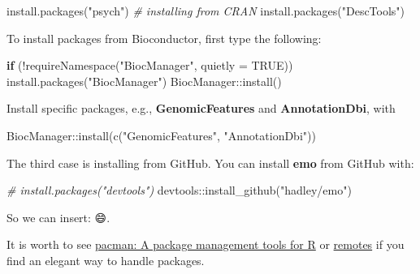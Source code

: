 \documentclass[
]{book}
\newenvironment{Shaded}{\begin{snugshade}}{\end{snugshade}}
\newcommand{\AttributeTok}[1]{\textcolor[rgb]{0.77,0.63,0.00}{#1}}
\newcommand{\CommentTok}[1]{\textcolor[rgb]{0.56,0.35,0.01}{\textit{#1}}}
\newcommand{\ConstantTok}[1]{\textcolor[rgb]{0.00,0.00,0.00}{#1}}
\newcommand{\ControlFlowTok}[1]{\textcolor[rgb]{0.13,0.29,0.53}{\textbf{#1}}}
\newcommand{\FunctionTok}[1]{\textcolor[rgb]{0.00,0.00,0.00}{#1}}
\newcommand{\NormalTok}[1]{#1}
\newcommand{\SpecialCharTok}[1]{\textcolor[rgb]{0.00,0.00,0.00}{#1}}
\newcommand{\StringTok}[1]{\textcolor[rgb]{0.31,0.60,0.02}{#1}}
\begin{document}
\begin{Shaded}
\begin{Highlighting}[]
\FunctionTok{install.packages}\NormalTok{(}\StringTok{"psych"}\NormalTok{)         }\CommentTok{\# installing from CRAN}
\FunctionTok{install.packages}\NormalTok{(}\StringTok{"DescTools"}\NormalTok{) }
\end{Highlighting}
\end{Shaded}

To install packages from Bioconductor, first type the following:

\begin{Shaded}
\begin{Highlighting}[]
\ControlFlowTok{if}\NormalTok{ (}\SpecialCharTok{!}\FunctionTok{requireNamespace}\NormalTok{(}\StringTok{"BiocManager"}\NormalTok{, }\AttributeTok{quietly =} \ConstantTok{TRUE}\NormalTok{))}
    \FunctionTok{install.packages}\NormalTok{(}\StringTok{"BiocManager"}\NormalTok{)}
\NormalTok{BiocManager}\SpecialCharTok{::}\FunctionTok{install}\NormalTok{()}
\end{Highlighting}
\end{Shaded}

Install specific packages, e.g., \textbf{GenomicFeatures} and \textbf{AnnotationDbi}, with

\begin{Shaded}
\begin{Highlighting}[]
\NormalTok{BiocManager}\SpecialCharTok{::}\FunctionTok{install}\NormalTok{(}\FunctionTok{c}\NormalTok{(}\StringTok{"GenomicFeatures"}\NormalTok{, }\StringTok{"AnnotationDbi"}\NormalTok{))}
\end{Highlighting}
\end{Shaded}

The third case is installing from GitHub. You can install \textbf{emo} from GitHub with:

\begin{Shaded}
\begin{Highlighting}[]
\CommentTok{\# install.packages("devtools")}
\NormalTok{devtools}\SpecialCharTok{::}\FunctionTok{install\_github}\NormalTok{(}\StringTok{"hadley/emo"}\NormalTok{)}
\end{Highlighting}
\end{Shaded}

So we can insert: 😄.

It is worth to see \href{https://github.com/trinker/pacman}{pacman: A package management tools for R} or \href{https://github.com/r-lib/remotes}{remotes} if you find an elegant way to handle packages.
\end{document}
